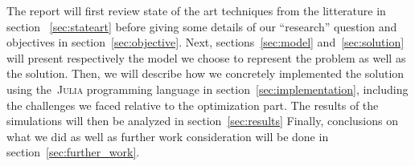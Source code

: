 The report will first review state of the art techniques from the litterature in section ~\ref{sec:stateart}
before giving some details of our ``research'' question and objectives in section~\ref{sec:objective}.
Next, sections~\ref{sec:model} and~\ref{sec:solution} will present respectively
the model we choose to represent the problem as well as the solution.
Then, we will describe how we concretely implemented the solution using the~\textsc{Julia}
programming language in section~\ref{sec:implementation}, including the challenges
we faced relative to the optimization part.
The results of the simulations will then be analyzed in section~\ref{sec:results}
Finally, conclusions on what we did as well as further work consideration
will be done in section~\ref{sec:further_work}.
